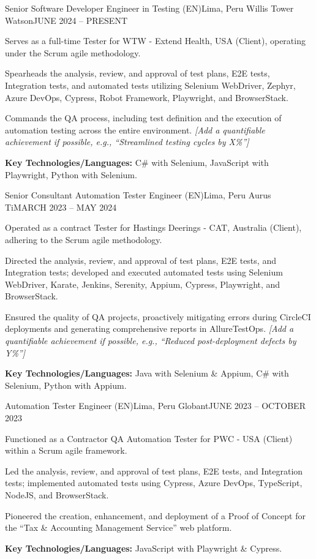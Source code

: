 \resumeSubheading
  {Senior Software Developer Engineer in Testing (EN)}{Lima, Peru} %
  {Willis Tower Watson}{JUNE 2024 -- PRESENT} %
\resumeItemListStart
    \item Serves as a full-time Tester for WTW - Extend Health, USA (Client), operating under the Scrum agile methodology.
    \item Spearheads the analysis, review, and approval of test plans, E2E tests, Integration tests, and automated tests utilizing Selenium WebDriver, Zephyr, Azure DevOps, Cypress, Robot Framework, Playwright, and BrowserStack.
    \item Commands the QA process, including test definition and the execution of automation testing across the entire environment. \textit{[Add a quantifiable achievement if possible, e.g., ``Streamlined testing cycles by X\%'']}
    \item \textbf{Key Technologies/Languages:} C\# with Selenium, JavaScript with Playwright, Python with Selenium.
\resumeItemListEnd

\resumeSubheading
  {Senior Consultant Automation Tester Engineer (EN)}{Lima, Peru}
  {Aurus Ti}{MARCH 2023 -- MAY 2024}
\resumeItemListStart
    \item Operated as a contract Tester for Hastings Deerings - CAT, Australia (Client), adhering to the Scrum agile methodology.
    \item Directed the analysis, review, and approval of test plans, E2E tests, and Integration tests; developed and executed automated tests using Selenium WebDriver, Karate, Jenkins, Serenity, Appium, Cypress, Playwright, and BrowserStack.
    \item Ensured the quality of QA projects, proactively mitigating errors during CircleCI deployments and generating comprehensive reports in AllureTestOps. \textit{[Add a quantifiable achievement if possible, e.g., ``Reduced post-deployment defects by Y\%'']}
    \item \textbf{Key Technologies/Languages:} Java with Selenium \& Appium, C\# with Selenium, Python with Appium.
\resumeItemListEnd

\resumeSubheading
  {Automation Tester Engineer (EN)}{Lima, Peru}
  {Globant}{JUNE 2023 -- OCTOBER 2023}
\resumeItemListStart
    \item Functioned as a Contractor QA Automation Tester for PWC - USA (Client) within a Scrum agile framework.
    \item Led the analysis, review, and approval of test plans, E2E tests, and Integration tests; implemented automated tests using Cypress, Azure DevOps, TypeScript, NodeJS, and BrowserStack.
    \item Pioneered the creation, enhancement, and deployment of a Proof of Concept for the ``Tax \& Accounting Management Service'' web platform.
    \item \textbf{Key Technologies/Languages:} JavaScript with Playwright \& Cypress.
\resumeItemListEnd

